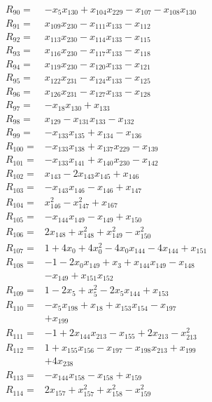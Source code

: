 \begin{align*}
R_{90}={}&-x_{5}x_{130} +x_{104}x_{229} -x_{107} -x_{108}x_{130}\\[3pt]
R_{91}={}&x_{109}x_{230} -x_{111}x_{133} -x_{112}\\[3pt]
R_{92}={}&x_{113}x_{230} -x_{114}x_{133} -x_{115}\\[3pt]
R_{93}={}&x_{116}x_{230} -x_{117}x_{133} -x_{118}\\[3pt]
R_{94}={}&x_{119}x_{230} -x_{120}x_{133} -x_{121}\\[3pt]
R_{95}={}&x_{122}x_{231} -x_{124}x_{133} -x_{125}\\[3pt]
R_{96}={}&x_{126}x_{231} -x_{127}x_{133} -x_{128}\\[3pt]
R_{97}={}&-x_{18}x_{130} +x_{133}\\[3pt]
R_{98}={}&x_{129} -x_{131}x_{133} -x_{132}\\[3pt]
R_{99}={}&-x_{133}x_{135} +x_{134} -x_{136}\\[3pt]
R_{100}={}&-x_{133}x_{138} +x_{137}x_{229} -x_{139}\\[3pt]
R_{101}={}&-x_{133}x_{141} +x_{140}x_{230} -x_{142}\\[3pt]
R_{102}={}&x_{143} -2x_{143}x_{145} +x_{146}\\[3pt]
R_{103}={}&-x_{143}x_{146} -x_{146} +x_{147}\\[3pt]
R_{104}={}&x_{146}^{2} -x_{147}^{2} +x_{167}\\[3pt]
R_{105}={}&-x_{144}x_{149} -x_{149} +x_{150}\\[3pt]
R_{106}={}&2x_{148} +x_{148}^{2} +x_{149}^{2} -x_{150}^{2}\\[3pt]
R_{107}={}&1 +4x_{0} +4x_{0}^{2} -4x_{0}x_{144} -4x_{144} +x_{151}\\[3pt]
R_{108}={}&-1 -2x_{0}x_{149} +x_{3} +x_{144}x_{149} -x_{148}\\
&-x_{149} +x_{151}x_{152}\\[3pt]
R_{109}={}&1 -2x_{5} +x_{5}^{2} -2x_{5}x_{144} +x_{153}\\[3pt]
R_{110}={}&-x_{5}x_{198} +x_{18} +x_{153}x_{154} -x_{197}\\
&+x_{199}\\[3pt]
R_{111}={}&-1 +2x_{144}x_{213} -x_{155} +2x_{213} -x_{213}^{2}\\[3pt]
R_{112}={}&1 +x_{155}x_{156} -x_{197} -x_{198}x_{213} +x_{199}\\
&+4x_{238}\\[3pt]
R_{113}={}&-x_{144}x_{158} -x_{158} +x_{159}\\[3pt]
R_{114}={}&2x_{157} +x_{157}^{2} +x_{158}^{2} -x_{159}^{2}\\[3pt]

\end{align*}
